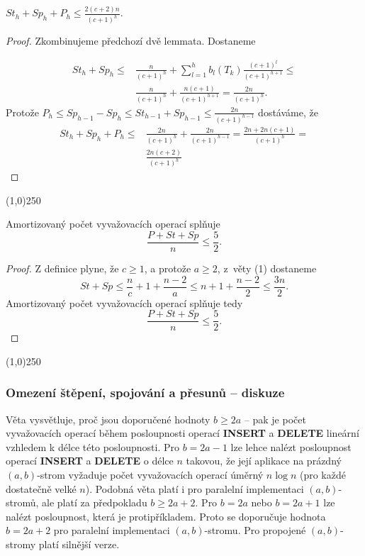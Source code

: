 \documentclass[a4paper,12pt]{article}
\newenvironment{myproof}{
  \begin{proof}
    
  }{
  \end{proof}
  \begin{center}
   \line(1,0){250}
   \end{center}
  }
\begin{document}
\begin{veta}[2]
    $St_h+Sp_h+P_h\le\frac {2(c+2)n}{(c+1)^h}.$
\end{veta}
\begin{myproof}
    Zkombinujeme předchozí dvě lemmata. Dostaneme
    
    \begin{align*} St_h+Sp_h\le&\frac n{(c+1)^h}+\sum_{l=1}^hb_l(T_k)\frac {
    (c+1)^l}{(c+1)^{h+1}}\le\\
    &\frac n{(c+1)^h}+\frac {n(c+1)}{(c+1)^{h+1}}=\frac {2n}{(c+1)^h}
    .\end{align*}
    Protože $P_h\le Sp_{h-1}-Sp_h\le St_{h-1}+Sp_{h-1}\le\frac {2n}{
    (c+1)^{h-1}}$ 
    dostáváme, že 
    \begin{align*} St_h+Sp_h+P_h\le&\frac {2n}{(c+1)^h}+\frac {2n}{(c+1)^{h
    -1}}=\frac {2n+2n(c+1)}{(c+1)^h}=\\
    &\frac {2n(c+2)}{(c+1)^h}\end{align*}
\end{myproof}

\begin{dusledek}
    Amortizovaný počet vyvažovacích operací splňuje 
    $$\frac {P+St+Sp}n\le\frac 52.$$
\end{dusledek}

\begin{myproof}
    
    Z definice plyne, že $c\ge 1$, a protože $a\ge 2$, z~věty (1) dostaneme
    $$St+Sp\le\frac nc+1+\frac {n-2}a\le n+1+\frac {n-2}2\le\frac {3n}
    2.$$
    Amortizovaný počet vyvažovacích operací splňuje tedy 
    $$\frac {P+St+Sp}n\le\frac 52.$$

\end{myproof}

\subsubsection{Omezení štěpení, spojování a přesunů -- diskuze}


Věta vysvětluje, proč jsou doporučené hodnoty $
b\ge 2a$ -- 
pak je počet vyvažovacích ope\-rací během posloupnosti 
operací {\bf INSERT} a {\bf DELETE} lineární vzhledem k délce 
této posloupnosti. Pro $b=2a-1$ lze lehce nalézt 
posloupnost operací {\bf INSERT} a {\bf DELETE} o délce $n$ takovou, 
že její aplikace na prázdný $(a,b)$-strom vyžaduje počet 
vyvažovacích operací ú\-měrný $n\log n$ (pro každé 
dostatečně velké $n$). Podobná věta platí i pro paralelní 
implementaci $(a,b)$-stromů, ale platí za 
předpokladu $b\ge 2a+2$. Pro $b=2a$ nebo $b=2a+1$ lze 
nalézt posloupnost, která je protipříkladem. Proto se 
doporučuje hodnota $b=2a+2$ pro paralelní implementaci 
$(a,b)$-stromu. Pro propojené $(a,b)$-stromy platí silnější 
verze.
\end{document}
